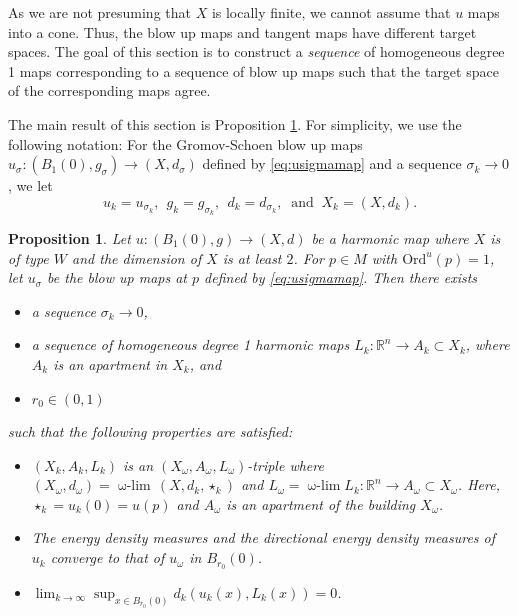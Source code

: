 \documentclass[12pt]{amsart}
\newtheorem{proposition}[theorem]{Proposition}
\theoremstyle{definition}
\numberwithin{equation}{section}
\newcommand{\R}{\mathbb R}
\newcommand{\B}{B}
\newcommand\wlim{\mathop{\mbox{$\omega$-$\lim$}}}
\begin{document}
As we are not presuming that $X$ is locally finite, we cannot assume that $u$ maps into a cone.  Thus, the blow up maps and tangent maps have different target spaces. The goal of this section is to construct a {\it sequence} of homogeneous degree 1 maps corresponding to a sequence of blow up maps such that the target space of the corresponding maps agree.

The main result of this section is Proposition \ref{LinearApprox}.
For simplicity, we use the following notation:   For the Gromov-Schoen blow up maps $u_\sigma:(B_1(0),g_\sigma)\to (X, d_\sigma)$ defined by \eqref{eq:usigmamap} and a sequence $\sigma_k \rightarrow 0$, we let
\[
u_k=u_{\sigma_k}, \ \ g_k=g_{\sigma_k}, \ \ d_k=d_{\sigma_k}, \ \mbox{ and } \ X_k=(X, d_k).
\]
 
\begin{proposition}\label{LinearApprox}
Let $u:(B_1(0),g) \to (X,d)$ be a harmonic map where $X$ is of type $W$ and the dimension of $X$ is at least $2$. For  $p \in M$ with $\text{Ord}^u(p)=1$, let $u_\sigma$ be the blow up maps at $p$ defined by \eqref{eq:usigmamap}. Then there exists 
\begin{itemize}
\item a sequence $\sigma_k \to 0$,
\item a sequence of  homogeneous degree 1 harmonic maps $L_k:\R^n \to A_k \subset X_k$, where $A_k$ is an apartment in $X_k$, and 
\item $r_0 \in (0,1)$
\end{itemize}
 such that the following properties are satisfied:
\begin{itemize}
\item[(i)]  
$(X_k, A_k, L_k)$ is an $(X_\omega, A_\omega, L_\omega)$-triple where 
$
(X_\omega,d_\omega)=\wlim \, (X,d_k, \star_k)$ and  $L_\omega=\wlim L_k:\R^n \rightarrow A_\omega \subset X_\omega$.  Here,  $\star_k=u_k(0)=u(p)$ and $A_\omega$ is an apartment of the building $X_\omega$. 
 \item[(ii)]  
 The energy density measures  and the directional energy density measures  of $u_k$ converge to that of $u_\omega$ in $B_{r_0}(0)$.
\item[(iii)] $\displaystyle{\lim_{k \rightarrow \infty} \sup_{x \in \B_{r_0}(0)}d_k( u_k(x), L_k(x)) = 0}$.
\end{itemize}
\end{proposition}
\end{document}
